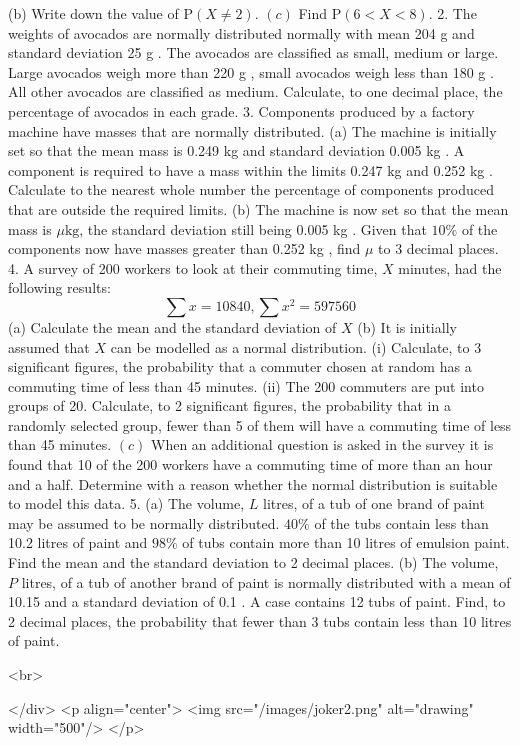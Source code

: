 (b) Write down the value of $\mathrm{P}(X \neq 2)$.
\((c)\) Find $\mathrm{P}(6<X<8)$.
2. The weights of avocados are normally distributed normally with mean 204 g and standard deviation 25 g . The avocados are classified as small, medium or large. Large avocados weigh more than 220 g , small avocados weigh less than 180 g . All other avocados are classified as medium. Calculate, to one decimal place, the percentage of avocados in each grade.
3. Components produced by a factory machine have masses that are normally distributed.
(a) The machine is initially set so that the mean mass is 0.249 kg and standard deviation 0.005 kg . A component is required to have a mass within the limits 0.247 kg and 0.252 kg . Calculate to the nearest whole number the percentage of components produced that are outside the required limits.
(b) The machine is now set so that the mean mass is $\mu \mathrm{kg}$, the standard deviation still being 0.005 kg . Given that $10 \%$ of the components now have masses greater than 0.252 kg , find $\mu$ to 3 decimal places.
4. A survey of 200 workers to look at their commuting time, $X$ minutes, had the following results:
$$
\sum x=10840, \sum x^{2}=597560
$$
(a) Calculate the mean and the standard deviation of $X$
(b) It is initially assumed that $X$ can be modelled as a normal distribution.
(i) Calculate, to 3 significant figures, the probability that a commuter chosen at random has a commuting time of less than 45 minutes.
(ii) The 200 commuters are put into groups of 20. Calculate, to 2 significant figures, the probability that in a randomly selected group, fewer than 5 of them will have a commuting time of less than 45 minutes.
\((c)\) When an additional question is asked in the survey it is found that 10 of the 200 workers have a commuting time of more than an hour and a half. Determine with a reason whether the normal distribution is suitable to model this data.
5. (a) The volume, $L$ litres, of a tub of one brand of paint may be assumed to be normally distributed. $40 \%$ of the tubs contain less than 10.2 litres of paint and $98 \%$ of tubs contain more than 10 litres of emulsion paint. Find the mean and the standard deviation to 2 decimal places.
(b) The volume, $P$ litres, of a tub of another brand of paint is normally distributed with a mean of 10.15 and a standard deviation of 0.1 . A case contains 12 tubs of paint. Find, to 2 decimal places, the probability that fewer than 3 tubs contain less than 10 litres of paint.

<br>

</div>
<p align="center">
<img src="/images/joker2.png" alt="drawing" width="500"/>
</p>
